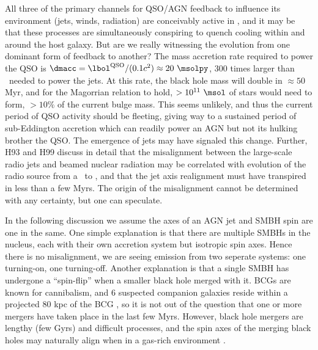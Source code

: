 \documentclass[useAMS,usenatbib]{mn2e}
\begin{document}
All three of the primary channels for QSO/AGN feedback to influence
its environment (jets, winds, radiation) are conceivably active in
\irs, and it may be that these processes are simultaneously conspiring
to quench cooling within and around the host galaxy. But are we really
witnessing the evolution from one dominant form of feedback to
another? The mass accretion rate required to power the QSO is $\dmacc
= \lqso/(0.1 c^2) \approx 20 ~\msolpy$, 300 times larger than
\dmacc\ needed to power the jets. At this rate, the black hole mass
will double in $\approx 50$ Myr, and for the Magorrian relation to
hold, $> 10^{11} ~\msol$ of stars would need to form, $> 10\%$ of the
current bulge mass. This seems unlikely, and thus the current period
of QSO activity should be fleeting, giving way to a sustained period
of sub-Eddington accretion which can readily power an AGN but not its
hulking brother the QSO. The emergence of jets may have signaled this
change. Further, H93 and H99 discuss in detail that the misalignment
between the large-scale radio jets and beamed nuclear radiation may be
correlated with evolution of the radio source from a \frii\ to \fri,
and that the jet axis realignment must have transpired in less than a
few Myrs. The origin of the misalignment cannot be determined with any
certainty, but one can speculate.

In the following discussion we assume the axes of an AGN jet and SMBH
spin are one in the same. One simple explanation is that there are
multiple SMBHs in the nucleus, each with their own accretion system
but isotropic spin axes. Hence there is no misalignment, we are seeing
emission from two seperate systems: one turning-on, one
turning-off. Another explanation is that a single SMBH has undergone a
``spin-flip'' \citep{2002Sci...297.1310M} when a smaller black hole
merged with it. BCGs are known for cannibalism, and 6 suspected
companion galaxies reside within a projected 80 kpc of the BCG
\citep{1996AJ....111..649S, 1999Ap&SS.266..113A}, so it is not out of
the question that one or more mergers have taken place in the last few
Myrs. However, black hole mergers are lengthy (few Gyrs) and difficult
processes, and the spin axes of the merging black holes may naturally
align when in a gas-rich environment \citep{2007ApJ...661L.147B}.
\end{document}
